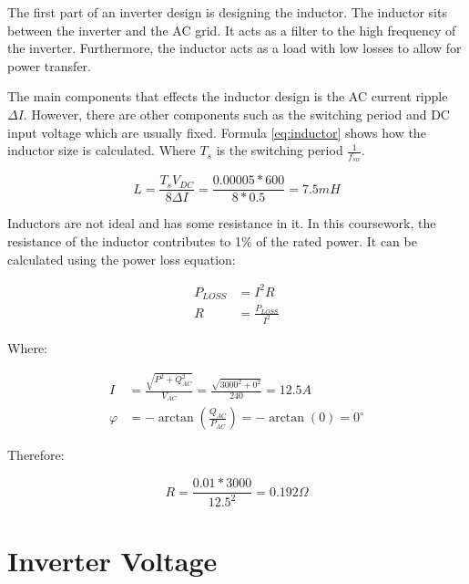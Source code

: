 \documentclass[12pt]{article}
\begin{document}
The first part of an inverter design is designing the inductor.
The inductor sits between the inverter and the AC grid.
It acts as a filter to the high frequency of the inverter.
Furthermore, the inductor acts as a load with low losses to allow for power transfer.

The main components that effects the inductor design is the AC current ripple $\Delta{I}$.
However, there are other components such as the switching period and DC input voltage which are usually fixed.
Formula \ref{eq:inductor} shows how the inductor size is calculated.
Where $T_{s}$ is the switching period $\frac{1}{f_{sw}}$.

\begin{equation} \label{eq:inductor}
    L = \frac{T_{s} V_{DC}}{8 \Delta{I}} = \frac{0.00005 * 600}{8 * 0.5} = 7.5 mH
\end{equation}

Inductors are not ideal and has some resistance in it.
In this coursework, the resistance of the inductor contributes to 1\% of the rated power.
It can be calculated using the power loss equation:

\begin{equation}
    \begin{aligned}
        P_{LOSS} & = I^{2} R                \\
        R        & = \frac{P_{LOSS}}{I^{2}}
    \end{aligned}
\end{equation}

Where:

\begin{equation} \label{eq:current-calculation}
    \begin{aligned}
        I       & = \frac{\sqrt{P^{2} + Q_{AC}^{2}}}{V_{AC}} = \frac{\sqrt{3000^{2} + 0^{2}}}{240} = 12.5 A \\
        \varphi & = -\arctan(\frac{Q_{AC}}{P_{AC}}) = -\arctan(0) = 0^{\circ{}}
    \end{aligned}
\end{equation}

Therefore:

\begin{equation}
    R = \frac{0.01 * 3000}{12.5^{2}} = 0.192 \Omega
\end{equation}

\section{Inverter Voltage}
\end{document}
